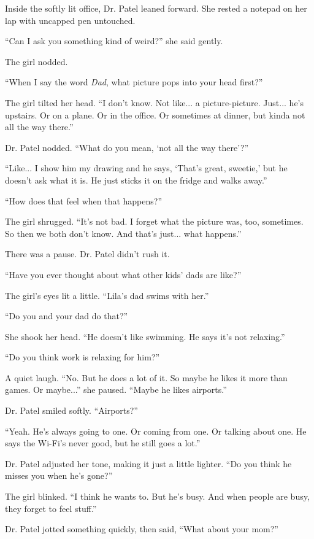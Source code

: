 Inside the softly lit office, Dr. Patel leaned forward. 
She rested a notepad on her lap with uncapped pen untouched.

``Can I ask you something kind of weird?'' she said gently.

The girl nodded.

``When I say the word \textit{Dad}, what picture pops into your head first?''

The girl tilted her head. 
``I don’t know. Not like... a picture-picture. Just... he’s upstairs. Or on a plane. 
Or in the office. Or sometimes at dinner, but kinda not all the way there.''

Dr. Patel nodded. ``What do you mean, ‘not all the way there’?''

``Like... I show him my drawing and he says, ‘That’s great, sweetie,’ but he doesn’t ask what it is. 
He just sticks it on the fridge and walks away.''

``How does that feel when that happens?''

The girl shrugged. ``It’s not bad. I forget what the picture was, too, sometimes. So then we both 
don’t know. And that’s just... what happens.''

There was a pause. Dr. Patel didn’t rush it.

``Have you ever thought about what other kids’ dads are like?''

The girl’s eyes lit a little. ``Lila’s dad swims with her.''

``Do you and your dad do that?''

She shook her head. ``He doesn’t like swimming. He says it's not relaxing.''

``Do you think work is relaxing for him?''

A quiet laugh. ``No. But he does a lot of it. So maybe he likes it more than games. Or maybe...'' 
she paused. ``Maybe he likes airports.''

Dr. Patel smiled softly. ``Airports?''

``Yeah. He’s always going to one. Or coming from one. Or talking about one. He says the Wi-Fi’s never 
good, but he still goes a lot.''

Dr. Patel adjusted her tone, making it just a little lighter. ``Do you think he misses you when he’s gone?''

The girl blinked. ``I think he wants to. But he’s busy. And when people are busy, they forget to feel stuff.''

Dr. Patel jotted something quickly, then said, ``What about your mom?''

